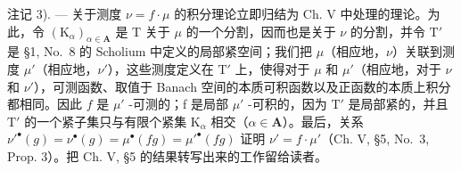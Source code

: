 注记 3). --- 关于测度 \(\nu = f \cdot \mu\) 的积分理论立即归结为 Ch. V 中处理的理论。为此，令 \((\mathrm{K}_{\alpha})_{\alpha \in \mathbf{A}}\) 是 T 关于 \(\mu\) 的一个分割，因而也是关于 \(\nu\) 的分割，并令 \(\mathrm{T}'\) 是 §1, No.~8 的 Scholium 中定义的局部紧空间；我们把 \(\mu\)（相应地，\(\nu\)）关联到测度 \(\mu'\)（相应地，\(\nu'\)），这些测度定义在 \(\mathrm{T}'\) 上，使得对于 \(\mu\) 和 \(\mu'\)（相应地，对于 \(\nu\) 和 \(\nu'\)），可测函数、取值于 Banach 空间的本质可积函数以及正函数的本质上积分都相同。因此 \(f\) 是 \(\mu'\) -可测的；f 是局部 \(\mu'\) -可积的，因为 \(\mathrm{T}'\) 是局部紧的，并且 \(\mathrm{T}'\) 的一个紧子集只与有限个紧集 \(\mathrm{K}_{\alpha}\) 相交（\(\alpha \in \mathbf{A}\)）。最后，关系 \(\nu'^{\bullet}(g) = \nu^{\bullet}(g) = \mu^{\bullet}(fg) = \mu'^{\bullet}(fg)\) 证明 \(\nu' = f \cdot \mu'\)（Ch. V, §5, No.~3, Prop. 3）。把 Ch. V, §5 的结果转写出来的工作留给读者。


